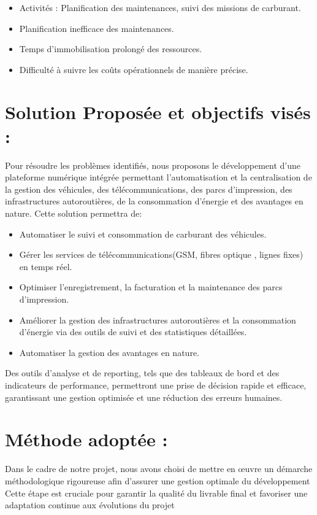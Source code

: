 \documentclass[a4paper,11pt]{report}
\begin{document}
\begin{enumerate}
\begin{itemize}

	\item Activités : Planification des maintenances, suivi des missions de carburant.
	\item Planification inefficace des maintenances.
	\item Temps d'immobilisation prolongé des ressources.
	\item Difficulté à suivre les coûts opérationnels de manière précise.
\end{itemize}

\end{enumerate}


\section{Solution Proposée et objectifs visés : }

Pour résoudre les problèmes identifiés, nous proposons le développement d'une plateforme numérique intégrée permettant l'automatisation et la centralisation de la gestion des véhicules, des télécommunications, des parcs d'impression, des infrastructures autoroutières, de la consommation d'énergie et des avantages en nature. Cette solution permettra de:
\begin{itemize}
\item Automatiser le suivi et consommation de carburant des véhicules.
\item Gérer les services de télécommunications(GSM, fibres optique , lignes fixes) en temps réel.
\item Optimiser l'enregistrement, la facturation et la maintenance des parcs d'impression.
\item Améliorer la gestion des infrastructures autoroutières et la consommation d'énergie via des outils de suivi et des statistiques détaillées.
\item Automatiser la gestion des avantages en nature.

\end{itemize}
Des outils d'analyse et de reporting, tels que des tableaux de bord et des indicateurs de performance, permettront une prise de décision rapide et efficace, garantissant une gestion optimisée et une réduction des erreurs humaines.

\section{Méthode adoptée : }
Dans le cadre de notre projet, nous avons choisi de mettre en œuvre un démarche méthodologique rigoureuse afin d'assurer une gestion optimale du développement
Cette étape est cruciale pour garantir la qualité du livrable final et favoriser une adaptation continue aux évolutions du projet
\end{document}
